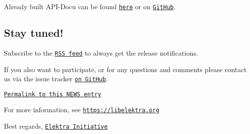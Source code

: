 Already built A\+P\+I-\/\+Docu can be found \href{https://doc.libelektra.org/api/0.8.26/html/}{\tt here} or on \href{https://github.com/ElektraInitiative/doc/tree/master/api/0.8.26}{\tt Git\+Hub}.

\subsection*{Stay tuned!}

Subscribe to the \href{https://www.libelektra.org/news/feed.rss}{\tt R\+SS feed} to always get the release notifications.

If you also want to participate, or for any questions and comments please contact us via the issue tracker \href{http://issues.libelektra.org}{\tt on Git\+Hub}.

\href{https://www.libelektra.org/news/0.8.26-release}{\tt Permalink to this N\+E\+WS entry}

For more information, see \href{https://libelektra.org}{\tt https\+://libelektra.\+org}

Best regards, \href{https://www.libelektra.org/developers/authors}{\tt Elektra Initiative} 